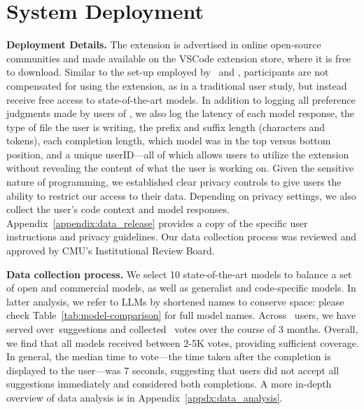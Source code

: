 \section{System Deployment}\label{sec:deployment}

\textbf{Deployment Details.} The \systemName extension is advertised in online open-source communities and made available on the VSCode extension store, where it is free to download. 
Similar to the set-up employed by~\citet{chiang2024chatbot} and \citet{lu2024wildvision}, participants are not compensated for using the extension, as in a traditional user study, but instead receive free access to state-of-the-art models.
In addition to logging all preference judgments made by users of \systemName, we also log the latency of each model response, the type of file the user is writing, the prefix and suffix length (characters and tokens), each completion length, which model was in the top versus bottom position, and a unique userID---all of which allows users to utilize the extension without revealing the content of what the user is working on.
Given the sensitive nature of programming, we established clear privacy controls to give users the ability to restrict our access to their data.
Depending on privacy settings, we also collect the user's code context and model responses.
Appendix~\ref{appendix:data_release} provides a copy of the specific user instructions and privacy guidelines.
Our data collection process was reviewed and approved by CMU's Institutional Review Board.


\textbf{Data collection process.} We select 10 state-of-the-art models to balance a set of open and commercial models, as well as generalist and code-specific models.
In latter analysis, we refer to LLMs by shortened names to conserve space: please check Table~\ref{tab:model-comparison} for full model names.
Across \userCount~users, we have served over~\completions suggestions and collected \sampleCount~votes over the course of 3 months.
Overall, we find that all models received between 2-5K votes, providing sufficient coverage. 
In general, the median time to vote---the time taken after the completion is displayed to the user---was 7 seconds, suggesting that users did not accept all suggestions immediately and considered both completions.
A more in-depth overview of data analysis is in Appendix~\ref{appdx:data_analysis}.

